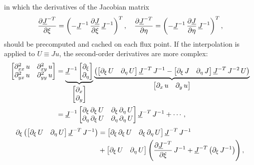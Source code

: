 \documentclass[10pt]{article}
\begin{document}
in which the derivatives of the Jacobian matrix
$$
\pdv{\underline{J}^{-T}}{\xi}=\left(-\underline{J}^{-1}\,\pdv{\underline{J}}{\xi}\,\underline{J}^{-1}\right)^{T},\quad
\pdv{\underline{J}^{-T}}{\eta}=\left(-\underline{J}^{-1}\,\pdv{\underline{J}}{\eta}\,\underline{J}^{-1}\right)^{T},
$$
should be precomputed and cached on each flux point.
%
%
If the interpolation is applied to $U\equiv Ju$, the second-order derivatives are more complex:
$$
\begin{aligned}\begin{bmatrix}\partial^2_{xx}\,u & \partial^2_{xy}\,u\\
\partial^2_{yx}\,u & \partial^2_{yy}\,u
\end{bmatrix} & =\underbrace{\underline{J}^{-1}\begin{bmatrix}\partial_{\xi}\\
\partial_{\eta}
\end{bmatrix}}_{\begin{bmatrix}\partial_{x}\\
\partial_{y}
\end{bmatrix}}\underbrace{\left(\mathinner{\begin{bmatrix}\partial_{\xi}\,U & \partial_{\eta}\,U\end{bmatrix}}\underline{J}^{-T}\,J^{-1}-\mathinner{\begin{bmatrix}\partial_{\xi}\,J & \partial_{\eta}\,J\end{bmatrix}}\underline{J}^{-T}\,J^{-2}\,U\right)}_{\begin{bmatrix}\partial_{x}\,u & \partial_{y}\,u\end{bmatrix}}\\
 & =\underline{J}^{-1}\mathinner{\begin{bmatrix}\partial_{\xi}\,\partial_{\xi}\,U & \partial_{\xi}\,\partial_{\eta}\,U\\
\partial_{\eta}\,\partial_{\xi}\,U & \partial_{\eta}\,\partial_{\eta}\,U
\end{bmatrix}}\underline{J}^{-T}\,J^{-1}+\cdots,
\end{aligned}
$$
%
$$
\begin{aligned}\partial_{\xi}\left(\mathinner{\begin{bmatrix}\partial_{\xi}\,U & \partial_{\eta}\,U\end{bmatrix}}\underline{J}^{-T}\,J^{-1}\right) & =\mathinner{\begin{bmatrix}\partial_{\xi}\,\partial_{\xi}\,U & \partial_{\xi}\,\partial_{\eta}\,U\end{bmatrix}}\underline{J}^{-T}\,J^{-1}\\
 & +\mathinner{\begin{bmatrix}\partial_{\xi}\,U & \partial_{\eta}\,U\end{bmatrix}}\left(\pdv{\underline{J}^{-T}}{\xi}\,J^{-1}+\underline{J}^{-T}\left(\partial_{\xi}\,J^{-1}\right)\right),
\end{aligned}
$$
\end{document}
